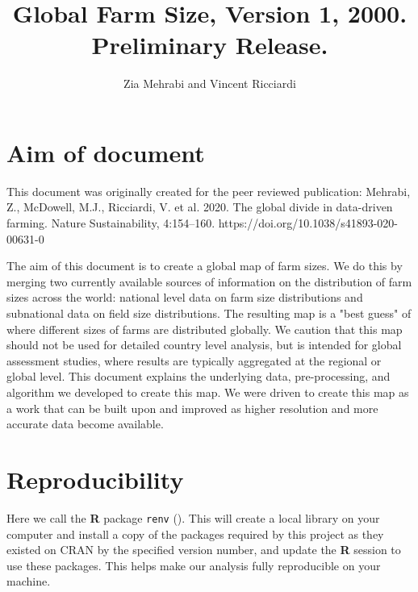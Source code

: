 \documentclass{article}
\title{Global Farm Size, Version 1, 2000. Preliminary Release.}
\author{Zia Mehrabi and Vincent Ricciardi}
\begin{document}





\maketitle

\tableofcontents

\newpage
\section{Aim of document}

This document was originally created for the peer reviewed publication:
Mehrabi, Z., McDowell, M.J., Ricciardi, V. et al. 2020. The global divide in data-driven farming. Nature Sustainability, 4:154–160. https://doi.org/10.1038/s41893-020-00631-0


The aim of this document is to create a global map of farm sizes. We do this by merging two currently available sources of information on the distribution of farm sizes across the world: national level data on farm size distributions and subnational data on field size distributions. The resulting map is a "best guess" of where different sizes of farms are distributed globally. We caution that this map should not be used for detailed country level analysis, but is intended for global assessment studies, where results are typically aggregated at the regional or global level. This document explains the underlying data, pre-processing, and algorithm we developed to create this map. We were driven to create this map as a work that can be built upon and improved as higher resolution and more accurate data become available.

\section{Reproducibility}
\label{reproducibility}

Here we call the  \textbf{R} package \texttt{renv} (\cite{R-renv}). This will create a local library on your computer and install a copy of the packages required by this project as they existed on CRAN by the specified version number, and update the \textbf{R} session to use these packages. This helps make our analysis fully reproducible on your machine. 
\end{document}
